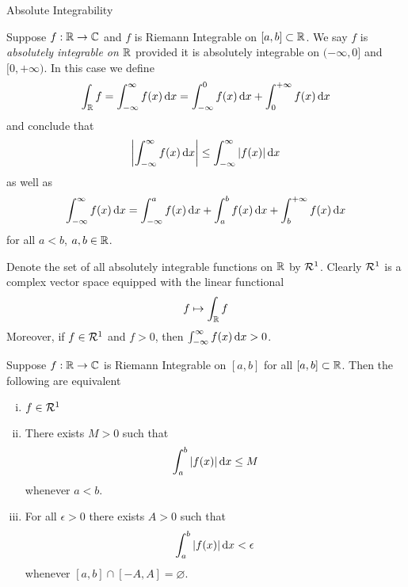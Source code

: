 \begin{section}{Absolute Integrability}
\begin{defn}
	Suppose $f:\mathbb{R} \to \mathbb{C}$ and $f$ is Riemann Integrable
	on $[a,b] \subset \mathbb{R}$. We say $f$ is \emph{absolutely
	integrable on $\mathbb{R}$} provided it is absolutely integrable
	on $(-\infty, 0]$ and $[0, +\infty)$. In this case we define
		\begin{displaymath}
		\int_{\mathbb{R}} f = \int_{-\infty}^{\infty}{f(x)}\, \mathrm{d}{x}
		= \int_{-\infty}^{0}{f(x)}\, \mathrm{d}{x} + \int_{0}^{+\infty}{f(x)}\, \mathrm{d}{x}
		\end{displaymath}
	and conclude that
		\begin{displaymath}
		\left \vert {\int_{-\infty}^{\infty}{f(x)}\, \mathrm{d}{x}} \right \vert \leq
		\int_{-\infty}^{\infty}{\left \vert {f(x)} \right \vert}\, \mathrm{d}{x}
		\end{displaymath}
	as well as
		\begin{displaymath}
		\int_{-\infty}^{\infty}{f(x)}\, \mathrm{d}{x}
		= \int_{-\infty}^{a}{f(x)}\, \mathrm{d}{x} +
		\int_{a}^{b}{f(x)}\, \mathrm{d}{x} +
		\int_{b}^{+\infty}{f(x)}\, \mathrm{d}{x}
		\end{displaymath}
	for all $a < b$, $a, b \in \mathbb{R}$.
\end{defn}

Denote the set of all absolutely integrable functions on $\mathbb{R}$
by $\mathcal{R}^1$. Clearly $\mathcal{R}^1$ is a complex vector space equipped
with the linear functional
	\begin{displaymath}
	f \mapsto \int_{\mathbb{R}} f
	\end{displaymath}
Moreover, if $f \in \mathcal{R}^1$ and $f > 0$, then
$\int_{-\infty}^{\infty}{f(x)}\, \mathrm{d}{x} > 0$.


\begin{prop}
	Suppose $f:\mathbb{R} \to \mathbb{C}$ is Riemann Integrable
	on $[a,b]$ for all $[a,b] \subset \mathbb{R}$. Then the
	following are equivalent
	
		\begin{enumerate}[i)]
			\item
			$f \in \mathcal{R}^1$
			
			\item
			There exists $M > 0$ such that
				\begin{displaymath}
					\int_{a}^{b}{\left \vert {f(x)} \right \vert}\, \mathrm{d}{x}
						\leq M
				\end{displaymath}
			whenever $a < b$.
			
			\item
			For all $\epsilon > 0$ there exists $A > 0$
			such that
				\begin{displaymath}
					\int_{a}^{b}{\left \vert {f(x)} \right \vert}\, \mathrm{d}{x}
						< \epsilon
				\end{displaymath}
			whenever $[a,b] \cap [-A,A] = \varnothing$.
		\end{enumerate}
\end{prop}


\end{section}
